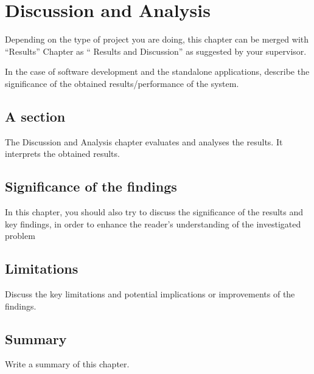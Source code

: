 \chapter{Discussion and Analysis}
\label{ch:evaluation}

Depending on the type of project you are doing, this chapter can be merged with ``Results'' Chapter as `` Results and Discussion'' as suggested by your supervisor. 

In the case of software development and the standalone applications, describe the significance of the obtained results/performance of the system. 



\section{A section}%
The Discussion and Analysis chapter evaluates and analyses the results. It interprets the obtained results. 



\section{Significance of the findings}
In this chapter, you should also try to discuss the significance of the results and key findings, in order to enhance the reader's understanding of the investigated problem

\section{Limitations} %
Discuss the key limitations and potential implications or improvements of the findings.
\section{Summary}
Write a summary of this chapter.